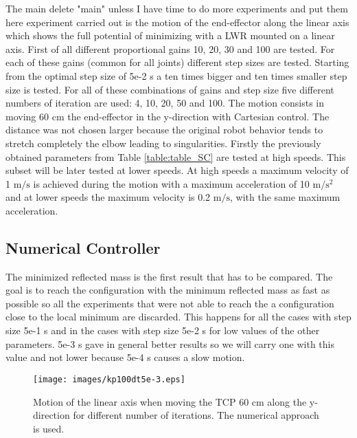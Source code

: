 The  main {\color{red} delete "main" unless I have time to do more experiments and put them here} experiment carried out is the motion of the end-effector along the linear axis which shows the full potential of minimizing with a LWR mounted on a linear axis.
First of all different proportional gains 10, 20, 30 and 100 are tested. For each of these gains (common for all joints) different step sizes are tested. Starting from the optimal step size of 5e-2 s a ten times bigger and ten times smaller step size is tested. For all of these combinations of gains and step size five different numbers of iteration are used: 4, 10, 20, 50 and 100.
The motion consists in moving 60 cm the end-effector in the y-direction with Cartesian control.
The distance was not chosen larger because the original robot behavior tends to stretch completely the elbow leading to singularities. 
 Firstly the previously obtained  parameters from Table 	\ref{table:table_SC} are tested at high speeds. This subset will be later tested at lower speeds. At high speeds a maximum velocity of 1 $\mathrm{m/s}$ is achieved during the motion with a maximum acceleration of 10 $\mathrm{m/s^{2}}$ and at lower speeds the maximum velocity is 0.2 $\mathrm{m/s}$, with the same maximum acceleration.





\subsection{Numerical Controller}




The minimized reflected mass is the first result that has to be compared. The goal is to reach the configuration with the minimum reflected mass as fast as possible so all the experiments that were not able to reach the a configuration close to the local minimum are discarded. This happens for all the cases with step size 5e-1 s and in the cases with step size  5e-2 s for low values of the other parameters. 5e-3 s gave in general better results so we will carry one with this value and not lower because 5e-4 s causes a  slow motion.
\begin{figure}[!htb]
	\centerline{
		\texttt{[image: images/kp100dt5e-3.eps]}}
	\caption{Motion of the linear axis when moving the TCP 60 cm along the y-direction for different number of iterations. The numerical approach is used.}
	\label{fig:kp100dt5e-3}
\end{figure}

